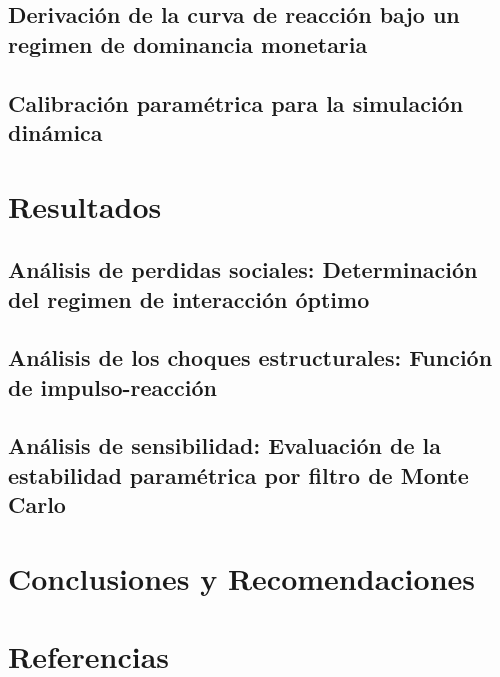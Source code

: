 \documentclass[
  man,
  longtable,
  nolmodern,
  notxfonts,
  notimes,
  colorlinks=true,linkcolor=blue,citecolor=blue,urlcolor=blue]{apa7}
\begin{document}
\subsection{Derivación de la curva de reacción bajo un regimen de
dominancia
monetaria}\label{derivaciuxf3n-de-la-curva-de-reacciuxf3n-bajo-un-regimen-de-dominancia-monetaria}

\subsection{Calibración paramétrica para la simulación
dinámica}\label{calibraciuxf3n-paramuxe9trica-para-la-simulaciuxf3n-dinuxe1mica}

\section{Resultados}\label{resultados}

\subsection{Análisis de perdidas sociales: Determinación del regimen de
interacción
óptimo}\label{anuxe1lisis-de-perdidas-sociales-determinaciuxf3n-del-regimen-de-interacciuxf3n-uxf3ptimo}

\subsection{Análisis de los choques estructurales: Función de
impulso-reacción}\label{anuxe1lisis-de-los-choques-estructurales-funciuxf3n-de-impulso-reacciuxf3n}

\subsection{Análisis de sensibilidad: Evaluación de la estabilidad
paramétrica por filtro de Monte
Carlo}\label{anuxe1lisis-de-sensibilidad-evaluaciuxf3n-de-la-estabilidad-paramuxe9trica-por-filtro-de-monte-carlo}

\section{Conclusiones y
Recomendaciones}\label{conclusiones-y-recomendaciones}

\newpage{}

\section{Referencias}\label{referencias}
\end{document}
